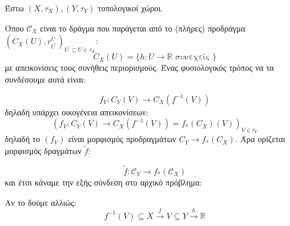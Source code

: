 \vspace*{0.1cm} 

\noindent Έστω $(X,\tau_X),(Y,\tau_Y)$ τοπολογικοί χώροι.

\begin{figure}[H]
    \centering
\end{figure}
\noindent Όπου $\mathcal{C}_X $ είναι το δράγμα που παράγεται από το (πλήρες) προδράγμα $(C_X(U),r^U_{U^{\prime}})_{U^{\prime}\subseteq U \in \tau_X}$:
$$C_X(U) = \{h:U\longrightarrow \mathbb{R} \text{ συνεχείς }\}$$ με απεικονίσεις τους συνήθεις περιορισμούς. Ένας φυσιολογικός τρόπος να τα συνδέσουμε αυτά είναι:
\begin{figure}[H]
    \centering
\end{figure}

$$f_V: C_Y(V) \longrightarrow C_X(f^{-1}(V))$$ δηλαδή υπάρχει οικογένεια απεικονίσεων:
$$(f_V: C_Y(V) \longrightarrow C_X(f^{-1}(V)) = f_*(C_X)(V))_{V\in \tau_Y}$$ δηλαδή το $(f_V)$ είναι μορφισμός προδραγμάτων $C_Y \longrightarrow f_*(C_X)$. Άρα ορίζεται μορφισμός δραγμάτων $\tilde{f}$:

$$\tilde{f}:\mathcal{C}_Y \longrightarrow f_*(\mathcal{C}_X)$$ και έτσι κάναμε την εξής σύνδεση στο αρχικό πρόβλημα:

\begin{figure}[H]
    \centering
\end{figure}

\noindent Αν το δούμε αλλιώς:
$$f^{-1}(V) \subseteq X \overset{f}{\longrightarrow} V \subseteq Y \overset{h}{\longrightarrow} \mathbb{R}$$

